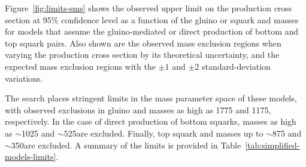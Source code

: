 Figure~\ref{fig:limits-sms} shows the observed upper limit on the
production cross section at 95\% confidence level as a function of the
gluino or squark and \chiz masses for models that assume the
gluino-mediated or direct production of bottom and top squark
pairs. Also shown are the observed mass exclusion regions when varying
the production cross section by its theoretical uncertainty, and the
expected mass exclusion regions with the ${\pm}1$ and ${\pm}2$
standard-deviation variations. 


The search places stringent limits in the mass parameter space of
these models, with observed exclusions in gluino and \chiz masses as
high as 1775 and 1175\GeV, respectively. In the case of direct
production of bottom squarks, masses as high as $\sim$1025 and
$\sim$525\GeV are excluded. Finally, top squark and \chiz masses up to
$\sim$875 and $\sim$350\GeV are excluded. A summary of the limits is
provided in Table~\ref{tab:simplified-models-limits}.

